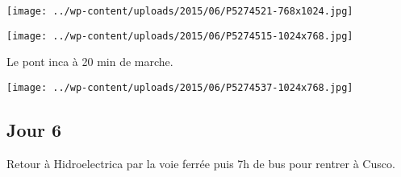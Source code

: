 \begin{center} \texttt{[image: ../wp-content/uploads/2015/06/P5274521-768x1024.jpg]} \end{center}
\vfill
\begin{center} \texttt{[image: ../wp-content/uploads/2015/06/P5274515-1024x768.jpg]} \end{center}
\vspace{-\topsep}
\vspace{-0.75mm}
\pagebreak

Le pont inca à 20 min de marche. 
\begin{center} \texttt{[image: ../wp-content/uploads/2015/06/P5274537-1024x768.jpg]} \end{center}

\subsection*{Jour 6}
Retour à Hidroelectrica par la voie ferrée puis 7h de bus pour rentrer à Cusco.
